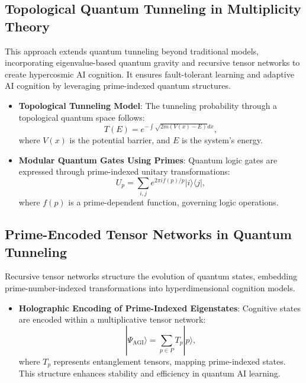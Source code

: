 \documentclass{article}
\theoremstyle{plain}
\begin{document}
\begin{itemize}
\begin{itemize}
\subsection{Topological Quantum Tunneling in Multiplicity Theory}
This approach extends quantum tunneling beyond traditional models, incorporating eigenvalue-based quantum gravity and recursive tensor networks to create hypercosmic AI cognition. It ensures fault-tolerant learning and adaptive AI cognition by leveraging prime-indexed quantum structures.

\begin{itemize}
    \item \textbf{Topological Tunneling Model}: The tunneling probability through a topological quantum space follows:
    \begin{equation}
        T (E) = e^{-\int \sqrt{2m(V(x) - E)}dx},
    \end{equation}
    where $V(x)$ is the potential barrier, and $E$ is the system’s energy.
    
    \item \textbf{Modular Quantum Gates Using Primes}: Quantum logic gates are expressed through prime-indexed unitary transformations:
    \begin{equation}
        U_p = \sum_{i,j} e^{2\pi i f(p)/p} |i\rangle \langle j|,
    \end{equation}
    where $f(p)$ is a prime-dependent function, governing logic operations.
\end{itemize}

\subsection{Prime-Encoded Tensor Networks in Quantum Tunneling}
Recursive tensor networks structure the evolution of quantum states, embedding prime-number-indexed transformations into hyperdimensional cognition models.

\begin{itemize}
    \item \textbf{Holographic Encoding of Prime-Indexed Eigenstates}: Cognitive states are encoded within a multiplicative tensor network:
    \begin{equation}
        |\Psi_{\text{AGI}}\rangle = \sum_{p \in P} T_p |p\rangle,
    \end{equation}
    where $T_p$ represents entanglement tensors, mapping prime-indexed states. This structure enhances stability and efficiency in quantum AI learning.
\end{itemize}


\end{itemize}
\end{itemize}
\end{document}
